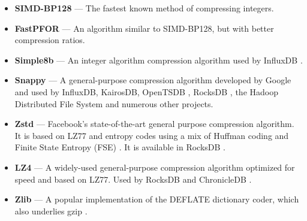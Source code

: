 \begin{itemize}[leftmargin=4mm]
\itemsep0mm
\item \textbf{SIMD-BP128} \cite{fastpfor} --- The fastest known method of compressing integers.
\item \textbf{FastPFOR} \cite{fastpfor} --- An algorithm similar to SIMD-BP128, but with better compression ratios.
\item \textbf{Simple8b} \cite{simple8b} --- An integer algorithm compression algorithm used by InfluxDB \cite{influxDB}.
\item \textbf{Snappy} \cite{snappy} --- A general-purpose compression algorithm developed by Google and used by InfluxDB, KairosDB, OpenTSDB \cite{openTSDB}, RocksDB \cite{rocksDB}, the Hadoop Distributed File System \cite{hdfs} and numerous other projects.
\item \textbf{Zstd} \cite{zstd} --- Facebook's state-of-the-art general purpose compression algorithm. It is based on LZ77 and entropy codes using a mix of Huffman coding and Finite State Entropy (FSE) \cite{fse}. It is available in RocksDB \cite{rocksDB}.
\item \textbf{LZ4} \cite{lz4} --- A widely-used general-purpose compression algorithm optimized for speed and based on LZ77. Used by RocksDB and ChronicleDB \cite{chronicleDB}.
\item \textbf{Zlib} \cite{zlib} --- A popular implementation of the DEFLATE \cite{deflate} dictionary coder, which also underlies gzip \cite{gzip}.

\end{itemize}

